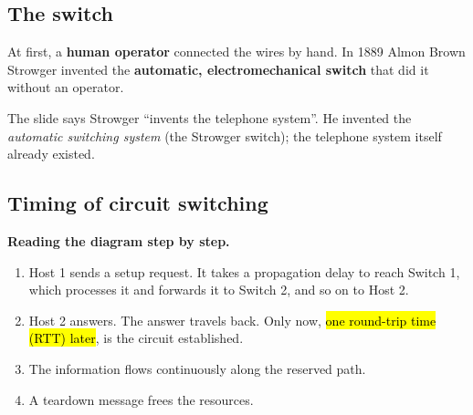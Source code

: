 \subsection{The switch}


At first, a \textbf{human operator} connected the wires by hand. In 1889 Almon Brown Strowger invented the \textbf{automatic, electromechanical switch}
that did it without an operator.

\begin{pitfall}
The slide says Strowger ``invents the telephone system''. He invented the \emph{automatic switching system} (the Strowger switch); the telephone system itself already existed.
\end{pitfall}


\subsection{Timing of circuit switching}


\textbf{Reading the diagram step by step.}
\begin{enumerate}
  \item Host 1 sends a setup request. It takes a propagation delay to reach Switch 1, which processes it and forwards it to Switch 2, and so on to Host 2.
  \item Host 2 answers. The answer travels back. Only now, \hl{one round-trip time (RTT) later}, is the circuit established.
  \item The information flows continuously along the reserved path.
  \item A teardown message frees the resources.
\end{enumerate}

